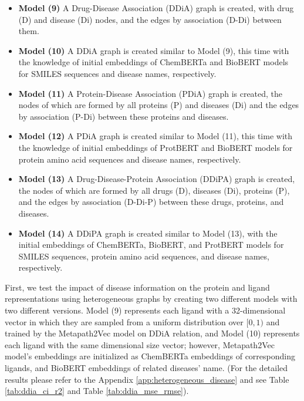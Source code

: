 \begin{itemize}
    \item \textbf{Model (9)} A Drug-Disease Association (DDiA) graph is created, with drug (D) and disease (Di) nodes, and the edges by association (D-Di) between them.  
    \item \textbf{Model (10)} A DDiA graph is created similar to Model (9), this time with the knowledge of initial embeddings of ChemBERTa and BioBERT models for SMILES sequences and disease names, respectively.
    \item \textbf{Model (11)} A Protein-Disease Association (PDiA) graph is created, the nodes of which are formed by all proteins (P) and diseases (Di) and the edges by association (P-Di) between these proteins and diseases.  
    \item \textbf{Model (12)} A PDiA graph is created similar to Model (11), this time with the knowledge of initial embeddings of ProtBERT and BioBERT models for protein amino acid sequences and disease names, respectively. 
    \item \textbf{Model (13)} A Drug-Disease-Protein Association (DDiPA) graph is created, the nodes of which are formed by all drugs (D), diseases (Di), proteins (P), and the edges by association (D-Di-P) between these drugs, proteins, and diseases.  
    \item \textbf{Model (14)} A DDiPA graph is created similar to Model (13), with the initial embeddings of ChemBERTa, BioBERT, and ProtBERT models for SMILES sequences, protein amino acid sequences, and disease names, respectively. 
\end{itemize}


First, we test the impact of disease information on the protein and ligand representations using heterogeneous graphs by creating two different models with two different versions. Model (9) represents each ligand with a 32-dimensional vector in which they are sampled from a uniform distribution over $[0, 1)$ and trained by the Metapath2Vec model on DDiA relation, and Model (10) represents each ligand with the same dimensional size vector; however, Metapath2Vec model's embeddings are initialized as ChemBERTa embeddings of corresponding ligands, and BioBERT embeddings of related diseases' name. (For the detailed results please refer to the Appendix \ref{app:heterogeneous_disease} and see Table \ref{tab:ddia_ci_r2} and Table \ref{tab:ddia_mse_rmse}).

